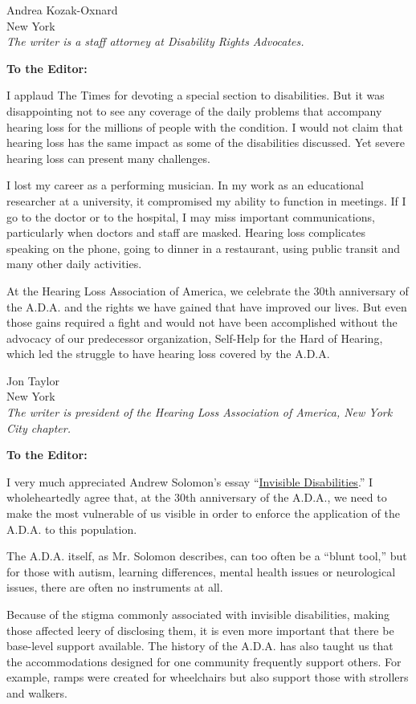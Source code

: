Andrea Kozak-Oxnard\\
New York\\
\emph{The writer is a staff attorney at Disability Rights Advocates.}

\textbf{To the Editor:}

I applaud The Times for devoting a special section to disabilities. But
it was disappointing not to see any coverage of the daily problems that
accompany hearing loss for the millions of people with the condition. I
would not claim that hearing loss has the same impact as some of the
disabilities discussed. Yet severe hearing loss can present many
challenges.

I lost my career as a performing musician. In my work as an educational
researcher at a university, it compromised my ability to function in
meetings. If I go to the doctor or to the hospital, I may miss important
communications, particularly when doctors and staff are masked. Hearing
loss complicates speaking on the phone, going to dinner in a restaurant,
using public transit and many other daily activities.

At the Hearing Loss Association of America, we celebrate the 30th
anniversary of the A.D.A. and the rights we have gained that have
improved our lives. But even those gains required a fight and would not
have been accomplished without the advocacy of our predecessor
organization, Self-Help for the Hard of Hearing, which led the struggle
to have hearing loss covered by the A.D.A.

Jon Taylor\\
New York\\
\emph{The writer is president of the Hearing Loss Association of
America, New York City chapter.}

\textbf{To the Editor:}

I very much appreciated Andrew Solomon's essay
``\href{https://www.nytimes.com/2020/07/10/style/invisible-disabilities.html}{Invisible
Disabilities}.'' I wholeheartedly agree that, at the 30th anniversary of
the A.D.A., we need to make the most vulnerable of us visible in order
to enforce the application of the A.D.A. to this population.

The A.D.A. itself, as Mr. Solomon describes, can too often be a ``blunt
tool,'' but for those with autism, learning differences, mental health
issues or neurological issues, there are often no instruments at all.

Because of the stigma commonly associated with invisible disabilities,
making those affected leery of disclosing them, it is even more
important that there be base-level support available. The history of the
A.D.A. has also taught us that the accommodations designed for one
community frequently support others. For example, ramps were created for
wheelchairs but also support those with strollers and walkers.

